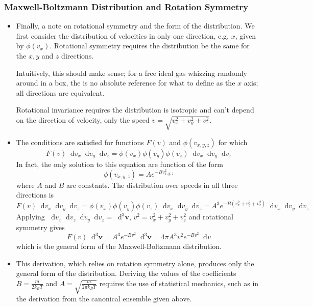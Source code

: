 \documentclass[11pt, a4paper]{article}
\newcommand{\diff}{\mathop{}\!\mathrm{d}} %
\begin{document}
\subsubsection{Maxwell-Boltzmann Distribution and Rotation Symmetry}
\begin{itemize}
	\item Finally, a note on rotational symmetry and the form of the distribution. We first consider the distribution of velocities in only one direction, e.g. $ x $, given by $ \phi (v_{x}) $. Rotational symmetry requires the distribution be the same for the $ x, y $ and $ z $ directions. 
	
	Intuitively, this should make sense; for a free ideal gas whizzing randomly around in a box, the is no absolute reference for what to define as the $ x $ axis; all directions are equivalent.
	
	Rotational invariance requires the distribution is isotropic and can't depend on the direction of velocity, only the speed $ v = \sqrt{v_{x}^{2} + v_{y}^{2} + v_{z}^{2}} $. 
	
	\item The conditions are satisfied for functions $ F(v) $ and $ \phi(v_{x, y, z}) $ for which
	\begin{equation*}
		F(v) \diff v_{x} \diff v_{y} \diff v_{z} = \phi (v_{x}) \phi (v_{y}) \phi (v_{z}) \diff v_{x} \diff v_{y} \diff v_{z}
	\end{equation*}
	In fact, the only solution to this equation are function of the form
	\begin{equation*}
		\phi(v_{x, y, z}) = A e^{-B v_{x, y, z}^{2}}
	\end{equation*}
	where $ A $ and $ B $ are constants. The distribution over speeds in all three directions is
	\begin{equation*}
		F(v) \diff v_{x} \diff v_{y} \diff v_{z} = \phi (v_{x}) \phi (v_{y}) \phi (v_{z}) \diff v_{x} \diff v_{y} \diff v_{z} = A^{3} e^{-B(v_{x}^{2} + v_{y}^{2} + v_{z}^{2})} \diff v_{x} \diff v_{y} \diff v_{z}
	\end{equation*}
	Applying $ \diff v_{x} \diff v_{z}\diff v_{y} \diff v_{z} = \diff^{3} \bm{v} $, $ v^{2} = v_{x}^{2} + v_{y}^{2} + v_{z}^{2} $ and rotational symmetry gives
	\begin{equation*}
		F(v) \diff^{3}\bm{v} = A^{3} e^{-B v^{2}}\diff^{3}\bm{v} = 4 \pi A^{3} v^{2}e^{-B v^{2}}\diff v
	\end{equation*}
	which is the general form of the Maxwell-Boltzmann distribution. 
	
	\item This derivation, which relies on rotation symmetry alone, produces only the general form of the distribution. Deriving the values of the coefficients $ B = \frac{m}{2k_{B}T} $ and $ A = \sqrt{\frac{m}{2\pi k_{B}T}} $ requires the use of statistical mechanics, such as in the derivation from the canonical ensemble given above.
\end{itemize}
\end{document}
